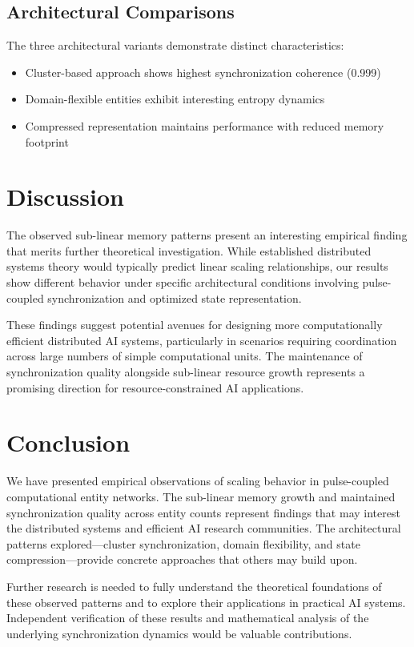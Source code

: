 \documentclass[12pt]{article}
\begin{document}
\subsection{Architectural Comparisons}
The three architectural variants demonstrate distinct characteristics:
\begin{itemize}
    \item Cluster-based approach shows highest synchronization coherence (0.999)
    \item Domain-flexible entities exhibit interesting entropy dynamics
    \item Compressed representation maintains performance with reduced memory footprint
\end{itemize}

\section{Discussion}
The observed sub-linear memory patterns present an interesting empirical finding that merits further theoretical investigation. While established distributed systems theory would typically predict linear scaling relationships, our results show different behavior under specific architectural conditions involving pulse-coupled synchronization and optimized state representation.

These findings suggest potential avenues for designing more computationally efficient distributed AI systems, particularly in scenarios requiring coordination across large numbers of simple computational units. The maintenance of synchronization quality alongside sub-linear resource growth represents a promising direction for resource-constrained AI applications.

\section{Conclusion}
We have presented empirical observations of scaling behavior in pulse-coupled computational entity networks. The sub-linear memory growth and maintained synchronization quality across entity counts represent findings that may interest the distributed systems and efficient AI research communities. The architectural patterns explored—cluster synchronization, domain flexibility, and state compression—provide concrete approaches that others may build upon.

Further research is needed to fully understand the theoretical foundations of these observed patterns and to explore their applications in practical AI systems. Independent verification of these results and mathematical analysis of the underlying synchronization dynamics would be valuable contributions.
\end{document}
